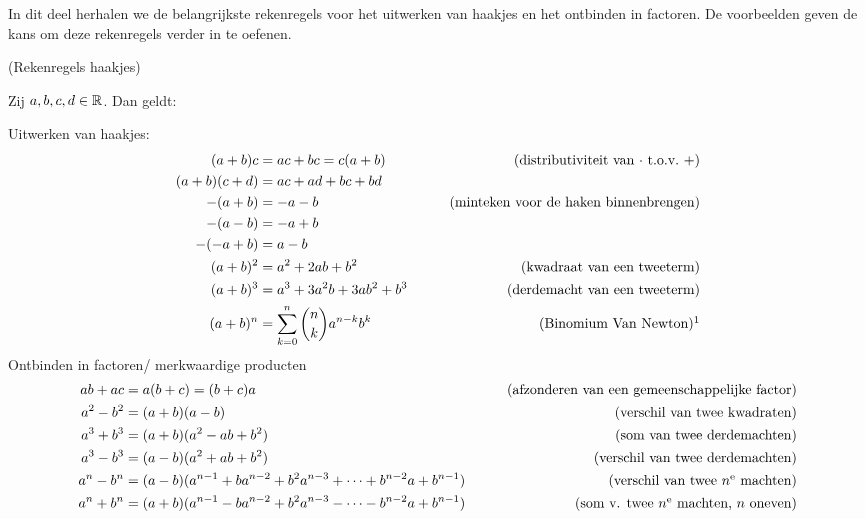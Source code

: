 \documentclass{ximera}
\begin{document}
    \author{Zomercursus KU Leuven}

In dit deel herhalen we de belangrijkste rekenregels voor het uitwerken van haakjes en het ontbinden in factoren. 
De voorbeelden geven de kans om deze rekenregels verder in te oefenen.


\begin{proposition} (Rekenregels haakjes)\label{eig: rekenregels haakjes}
    
    
Zij $a,b,c,d\in \mathbb{R}$. Dan geldt:


Uitwerken van haakjes:
\begin{align*}
%
    (a+b)c     &=  ac+bc = c(a+b)     &\tag{distributiviteit van $\cdot$ t.o.v.~$+$}\\
    (a+b)(c+d) &=  ac+ad+bc+bd        &\\
%
    -(a+b)     &=  -a-b               &\tag{minteken voor de haken binnenbrengen}\\
    -(a-b)     &= -a+b                &\\
    -(-a+b)    &=  a-b                &\\
%
    (a+b)^2    &= a^2+2ab+b^2         &\tag{kwadraat van een tweeterm}\\
%
    (a+b)^3    &= a^3+3a^2b+3ab^2+b^3 &\tag{derdemacht van een tweeterm}\\
%
    (a+b)^n    &= \ds{\sum^n_{k=0}{n\choose k} a^{n-k}b^k}
                                      &\tag{Binomium Van Newton}\footnotemark
%
\end{align*}
Ontbinden in factoren\footnotemark / merkwaardige producten 
\begin{align*}
   ab+ac    &= a(b+c)=(b+c)a      &\tag{afzonderen van een gemeenschappelijke factor}\\
%
   a^2-b^2  &=  (a+b)(a-b)        &\tag{verschil van twee kwadraten}\\
% 
    a^3+b^3 &=  (a+b)(a^2-ab+b^2) & \tag{som van twee derdemachten}\\
% 
    a^3-b^3 &= (a-b)(a^2+ab+b^2)  & \tag{verschil van twee derdemachten}\\
% 
    a^n-b^n &= (a-b)(a^{n-1}+ba^{n-2}+b^2a^{n-3}+\cdots+b^{n-2}a+b^{n-1})
                                  &\tag{verschil van twee $n^{\text{e}}$ machten}\\
% 
    a^n+b^n &=  (a+b)(a^{n-1}-ba^{n-2}+b^2a^{n-3}- \cdots - b^{n-2}a+b^{n-1})
                                  & \tag{som v. twee $n^{\text{e}}$ machten, $n$ oneven}\\
\end{align*}
\end{proposition}
\end{document}
